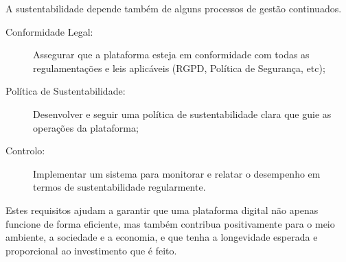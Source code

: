 A sustentabilidade depende também de alguns processos de gestão continuados.

\begin{description}
    \item[Conformidade Legal:] Assegurar que a plataforma esteja em conformidade com todas as regulamentações e leis aplicáveis
    (RGPD, Política de Segurança, etc);
    \item[Política de Sustentabilidade:] Desenvolver e seguir uma política de sustentabilidade clara que guie as operações da 
    plataforma;
    \item[Controlo:] Implementar um sistema para monitorar e relatar o desempenho em termos de sustentabilidade 
    regularmente.
\end{description}

Estes requisitos ajudam a garantir que uma plataforma digital não apenas funcione de forma eficiente, mas também 
contribua positivamente para o meio ambiente, a sociedade e a economia, e que tenha a longevidade esperada e proporcional ao 
investimento que é feito.



